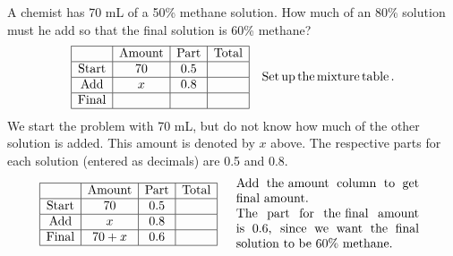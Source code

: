 \begin{example}  
  A chemist has 70 mL of a 50\% methane solution. How much of an 80\% solution
  must he add so that the final solution is 60\% methane?
  \begin{eqnarray*}
    \begin{array}{|c|c|c|c|}
      \hline
      & \tmop{Amount} & \tmop{Part} & \tmop{Total}\\
      \hline
      \tmop{Start} & 70 & 0.5 & \\
      \hline
      \tmop{Add} & x & 0.8 & \\
      \hline
      \tmop{Final} &  &  & \\
      \hline
    \end{array} &  & %
      \tmop{Set} \tmop{up} \tmop{the} \tmop{mixture} \tmop{table}.%
    \end{eqnarray*}
		We start the problem with 70 mL, but do not know how much of the other solution is added.  This amount is denoted by $x$ above.  The respective parts for each solution (entered as decimals) are 0.5 and 0.8.  
		\begin{eqnarray*}
		\begin{array}{|c|c|c|c|}
      \hline
      & \tmop{Amount} & \tmop{Part} & \tmop{Total}\\
      \hline
      \tmop{Start} & 70 & 0.5 & \\
      \hline
      \tmop{Add} & x & 0.8 & \\
      \hline
      \tmop{Final} & 70 + x & 0.6 & \\
      \hline
    \end{array} &  & \begin{array}{p{0.425\textwidth}}
      \tmop{Add} \tmop{the~amount} \tmop{column} \tmop{to} \tmop{get} \tmop{final}
      \tmop{amount}.\\
			\tmop{The} \tmop{part} \tmop{for} \tmop{the~final} \tmop{amount} \tmop{is} 0.6,
      \tmop{since} \tmop{we} \tmop{want} \tmop{the}
      \tmop{final} \tmop{solution} \tmop{to} \tmop{be} 60\% \tmop{methane}.

\end{array}
\end{eqnarray*}
\end{example}
